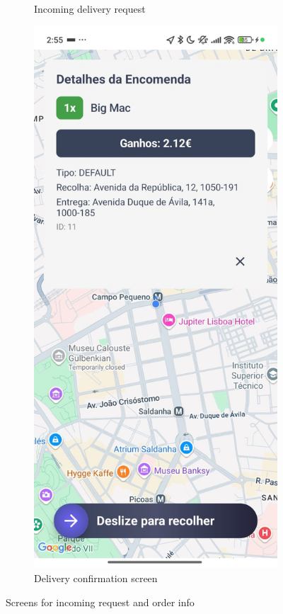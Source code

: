 \begin{figure}[H]
\begin{subfigure}[b]{0.48\textwidth}
        \caption{Incoming delivery request}
        \label{fig:delivery_request}
    \end{subfigure}
    \hfill
    \begin{subfigure}[b]{0.48\textwidth}
        \centering
        \includegraphics[width=\textwidth]{images/order_info_screen.jpeg}
        \caption{Delivery confirmation screen}
        \label{fig:order_info}
    \end{subfigure}
    \caption{Screens for incoming request and order info}
    \label{fig:courier_pickup}
\end{figure}

